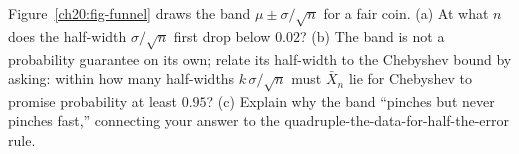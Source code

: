 \begin{exercise}
Figure~\ref{ch20:fig-funnel} draws the band $\mu \pm \sigma/\sqrt n$ for a fair coin. (a) At what $n$ does the half-width $\sigma/\sqrt n$ first drop below $0.02$? (b) The band is not a probability guarantee on its own; relate its half-width to the Chebyshev bound by asking: within how many half-widths $k\,\sigma/\sqrt n$ must $\bar X_n$ lie for Chebyshev to promise probability at least $0.95$? (c) Explain why the band ``pinches but never pinches fast,'' connecting your answer to the quadruple-the-data-for-half-the-error rule.
\end{exercise}
